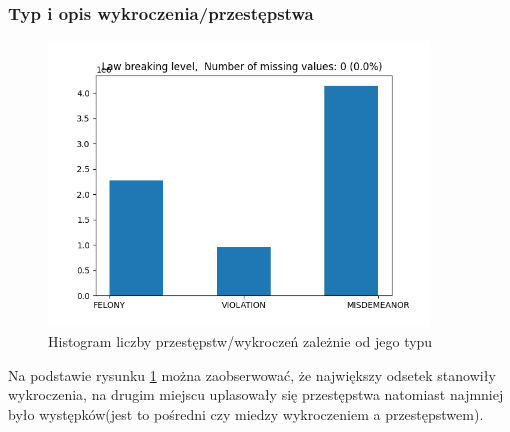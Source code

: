 \documentclass{classrep}
\begin{document}
{{            \subsubsection{Typ i opis wykroczenia/przestępstwa} {
                \begin{figure}[!htbp]
                    \centering
                    \includegraphics[width=0.9\textwidth]{img/Lawbreakinglevel-133608.png}
                    \caption{Histogram liczby przestępstw/wykroczeń zależnie od jego typu}
                    \label{hist_law_breaking_level}
                \end{figure}
                \FloatBarrier
                
                Na podstawie rysunku \ref{hist_law_breaking_level} można zaobserwować, że największy odsetek stanowiły wykroczenia, na drugim miejscu uplasowały się przestępstwa natomiast najmniej było występków(jest to pośredni czy miedzy wykroczeniem a przestępstwem).
            }

}}
\end{document}
